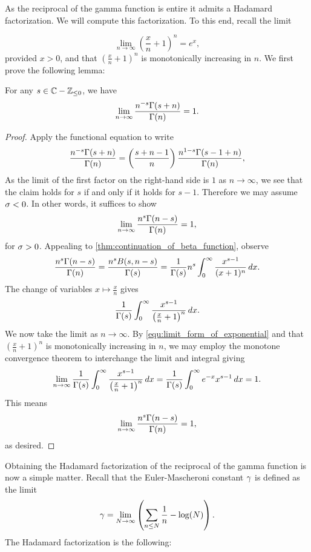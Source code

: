 \documentclass[12pt]{article}
\begin{document}
    As the reciprocal of the gamma function is entire it admits a Hadamard factorization. We will compute this factorization. To this end, recall the limit

    \begin{equation}\label{equ:limit_form_of_exponential}
      \lim_{n \to \infty}\left(\frac{x}{n}+1\right)^{n} = e^{x},
    \end{equation}
    provided \(x > 0\), and that \(\left(\frac{x}{n}+1\right)^{n}\) is monotonically increasing in \(n\). We first prove the following lemma:

    \begin{lemma}\label{lem:Hadamard_factorization_of_gamma_function_lemma}
      For any \(s \in \mathbb{C}-\mathbb{Z}_{\le 0}\), we have
      \[
        \lim_{n \to \infty}\frac{n^{-s}\Gamma(s+n)}{\Gamma(n)} = 1.
      \]
    \end{lemma}
    \begin{proof}
      Apply the functional equation to write
      \[
        \frac{n^{-s}\Gamma(s+n)}{\Gamma(n)} = \left(\frac{s+n-1}{n}\right)\frac{n^{1-s}\Gamma(s-1+n)}{\Gamma(n)},
      \]
      As the limit of the first factor on the right-hand side is \(1\) as \(n \to \infty\), we see that the claim holds for \(s\) if and only if it holds for \(s-1\). Therefore we may assume \(\sigma < 0\). In other words, it suffices to show
      \[
        \lim_{n \to \infty}\frac{n^{s}\Gamma(n-s)}{\Gamma(n)} = 1,
      \]
      for \(\sigma > 0\). Appealing to \cref{thm:continuation_of_beta_function}, observe
      \[
       \frac{n^{s}\Gamma(n-s)}{\Gamma(n)} = \frac{n^{s}B(s,n-s)}{\Gamma(s)} = \frac{1}{\Gamma(s)}n^{s}\int_{0}^{\infty}\frac{x^{s-1}}{(x+1)^{n}}\,dx.
      \]
      The change of variables \(x \mapsto \frac{x}{n}\) gives
      \[ 
        \frac{1}{\Gamma(s)}\int_{0}^{\infty}\frac{x^{s-1}}{\left(\frac{x}{n}+1\right)^{n}}\,dx.
      \]
      We now take the limit as \(n \to \infty\). By \cref{equ:limit_form_of_exponential} and that \(\left(\frac{x}{n}+1\right)^{n}\) is monotonically increasing in \(n\), we may employ the monotone convergence theorem to interchange the limit and integral giving
      \[
        \lim_{n \to \infty}\frac{1}{\Gamma(s)}\int_{0}^{\infty}\frac{x^{s-1}}{\left(\frac{x}{n}+1\right)^{n}}\,dx = \frac{1}{\Gamma(s)}\int_{0}^{\infty}e^{-x}x^{s-1}\,dx = 1.
      \]
      This means
      \[
        \lim_{n \to \infty}\frac{n^{s}\Gamma(n-s)}{\Gamma(n)} = 1,
      \]
      as desired.
    \end{proof}

    Obtaining the Hadamard factorization of the reciprocal of the gamma function is now a simple matter. Recall that the Euler-Mascheroni constant \(\gamma\) is defined as the limit
    \begin{equation}\label{equ:Euler-Mascheroni_constant_definition}
      \gamma = \lim_{N \to \infty}\left(\sum_{n \le N}\frac{1}{n}-\log(N)\right).
    \end{equation}
    The Hadamard factorization is the following:
\end{document}

